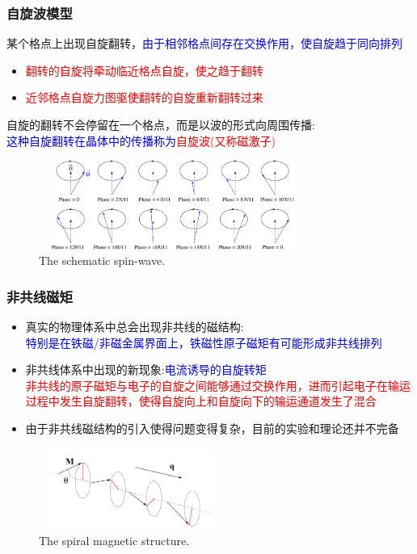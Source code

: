 {\frame
{
	\frametitle{自旋波模型}
	某个格点上出现自旋翻转，\textcolor{blue}{由于相邻格点间存在交换作用，使自旋趋于同向排列}
	\begin{itemize}
		\item \textcolor{red}{翻转的自旋将牵动临近格点自旋，使之趋于翻转}
		\item \textcolor{red}{近邻格点自旋力图驱使翻转的自旋重新翻转过来}
	\end{itemize}
	自旋的翻转不会停留在一个格点，而是以波的形式向周围传播:\\
	\textcolor{blue}{这种自旋翻转在晶体中的传播称为}\textcolor{red}{自旋波(又称磁激子)}
\begin{figure}[h!]
\centering
\includegraphics[height=1.15in,width=3.45in,viewport=0 0 830 300,clip]{Figures/Mag_spinwave-2.png}
\caption{\tiny \textrm{The schematic spin-wave.}}%
\label{Mag_spinwave-2}
\end{figure}
}

\frame
{
	\frametitle{非共线磁矩}
	\begin{itemize}
		\item 真实的物理体系中总会出现非共线的磁结构:\\\textcolor{blue}{特别是在铁磁/非磁金属界面上，铁磁性原子磁矩有可能形成非共线排列}
		\item 非共线体系中出现的新现象:\textcolor{blue}{电流诱导的自旋转矩}\\
			\textcolor{red}{非共线的原子磁矩与电子的自旋之间能够通过交换作用，进而引起电子在输运过程中发生自旋翻转，使得自旋向上和自旋向下的输运通道发生了混合}%
		\item 由于非共线磁结构的引入使得问题变得复杂，目前的实验和理论还并不完备
	\end{itemize}
\begin{figure}[h!]
\centering
\vspace*{-0.10in}
\includegraphics[height=1.05in,width=2.40in,viewport=10 10 840 370,clip]{Figures/Magnet_spinal_wave.png}
\caption{\tiny \textrm{The spiral magnetic structure.}}%
\label{Mag_spinal-wave}
\end{figure}
}

}
